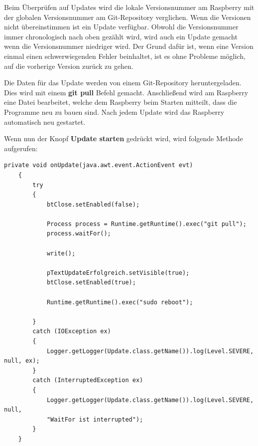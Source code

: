 \vspace{10pt}

Beim Überprüfen auf Updates wird die lokale Versionsnummer am Raspberry mit der globalen Versionsnummer am Git-Repository verglichen. Wenn die Versionen nicht übereinstimmen ist ein Update verfügbar. Obwohl die Versionsnummer immer chronologisch nach oben gezählt wird, wird auch ein Update gemacht wenn die Versionsnummer niedriger wird. Der Grund dafür ist, wenn eine Version einmal einen schwerwiegenden Fehler beinhaltet, ist es ohne Probleme möglich, auf die vorherige Version zurück zu gehen. 

\vspace{10pt}

Die Daten für das Update werden von einem Git-Repository heruntergeladen. Dies wird mit einem \textbf{git pull} Befehl gemacht. Anschließend wird am Raspberry eine Datei bearbeitet, welche dem Raspberry beim Starten mitteilt, dass die Programme neu zu bauen sind. Nach jedem Update wird das Raspberry automatisch neu gestartet.

\vspace{10pt}

Wenn nun der Knopf \textbf{Update starten} gedrückt wird, wird folgende Methode aufgerufen:
\begin{lstlisting}[style=JavaStyle, caption= Update]
    private void onUpdate(java.awt.event.ActionEvent evt)                          
    {                              
        try
        {
            btClose.setEnabled(false);
            
            Process process = Runtime.getRuntime().exec("git pull");
            process.waitFor();

            write();

            pTextUpdateErfolgreich.setVisible(true);
            btClose.setEnabled(true);

            Runtime.getRuntime().exec("sudo reboot");

        }
        catch (IOException ex)
        {
            Logger.getLogger(Update.class.getName()).log(Level.SEVERE, null, ex);
        }
        catch (InterruptedException ex)
        {
            Logger.getLogger(Update.class.getName()).log(Level.SEVERE, null, 
            "WaitFor ist interrupted");
        }        
    }
\end{lstlisting}

\newpage


